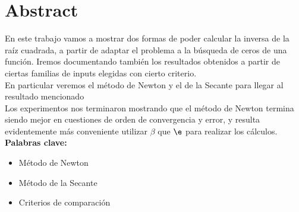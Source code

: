 \section{Abstract}

En este trabajo vamos a mostrar dos formas de poder
calcular la inversa de la raíz cuadrada, a partir de adaptar el problema a la
búsqueda de ceros de una función. Iremos documentando también los resultados
obtenidos a partir de ciertas familias de inputs elegidas con cierto
criterio.\\

En particular veremos el método de Newton y el de la Secante para llegar al
resultado mencionado\\

Los experimentos nos terminaron mostrando que el método de Newton termina
siendo mejor en cuestiones de orden de convergencia y error, y resulta evidentemente más conveniente utilizar $\beta$
que $\e$ para realizar los cálculos.\\

{\bf Palabras clave:}
\begin{itemize} 
    \item Método de Newton 
    \item Método de la Secante 
    \item Criterios de comparación 
\end{itemize}
